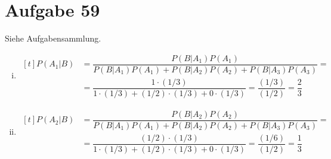 \section{Aufgabe 59}
\setcounter{section}{59}

Siehe Aufgabensammlung.
\begin{enumerate}[i)]
    \item
        $\begin{aligned}[t]
            P(A_1|B) &= \dfrac{P(B|A_1)P(A_1)}{P(B|A_1)P(A_1) + P(B|A_2)P(A_2) + P(B|A_3)P(A_3)} = \\
                     &= \dfrac{1 \cdot (1/3)}{1 \cdot (1/3) + (1/2) \cdot (1/3) + 0 \cdot (1/3)} = \dfrac{(1 / 3)}{(1/2)} = \dfrac{2}{3}
        \end{aligned}$
    \item
        $\begin{aligned}[t]
            P(A_2|B) &= \dfrac{P(B|A_2)P(A_2)}{P(B|A_1)P(A_1) + P(B|A_2)P(A_2) + P(B|A_3)P(A_3)} = \\
                     &= \dfrac{(1/2) \cdot (1/3)}{1 \cdot (1/3) + (1/2) \cdot (1/3) + 0 \cdot (1/3)} = \dfrac{(1/6)}{(1/2)} = \dfrac{1}{3}
        \end{aligned}$
\end{enumerate}
